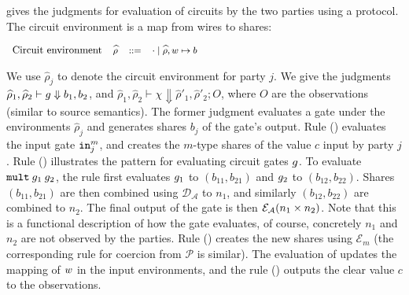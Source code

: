  gives the judgments for evaluation of circuits by
the two parties using a \mpc protocol. The circuit environment  is a
map from wires to shares:

\vspace{0.2cm}
$
\footnotesize
\begin{array}{rrcl}
    \text{\small{Circuit environment}} & \widehat\rho &::=& \cdot \mid \widehat\rho,w \mapsto b\\
\end{array}
$
\vspace{0.2cm}

We use $\widehat\rho_j$ to denote the circuit environment for party $j.$ 
We give the 
judgments $\widehat{\rho}_{1}, \widehat{\rho}_{2} \vdash {g}
\Downarrow b_{1}, b_{2}$, and $\widehat{\rho}_{1}, \widehat{\rho}_{2}
\vdash \chi \Downarrow \widehat{\rho}'_{1}, \widehat{\rho}'_{2}; O$,
where $O$ are the observations (similar to source semantics). 
The former judgment evaluates a gate under the environments
$\widehat{\rho}_j$ and generates shares $b_j$ of the gate's output.
Rule ({}) evaluates the input gate ${\mathtt{in}}^{m}_{j}$, and
creates the $m$-type shares of the value $c$ input by party $j$.
Rule ({}) illustrates the pattern for evaluating circuit
gates ${g}$. To evaluate ${\mathtt{mult}}\:{g}_{1}\:{g}_{2}$, the
rule first evaluates ${g}_{1}$ to $(b_{11}, b_{21})$ and
${g}_{2}$ to $(b_{12}, b_{22})$. Shares $(b_{11}, b_{21})$ are then
combined using $\mathcal{D_{\mathcal{A}}}$ to $n_{1}$, and similarly
$(b_{12}, b_{22})$ are combined to $n_{2}$. The final output of the
 gate is then $\mathcal{E}_{\mathcal{A}}(n_{1} \times n_{2})$. Note
that this is a functional description of how the  gate
evaluates, of course, concretely $n_{1}$ and $n_{2}$ are not observed
by the parties. Rule ({}) creates the new shares using
$\mathcal{E}_m$ (the corresponding rule for coercion from
$\mathcal{P}$ is similar). The evaluation
of  updates the mapping of $w$ in the input environments, and
the rule ({}) outputs the clear value $c$ to the
observations.




